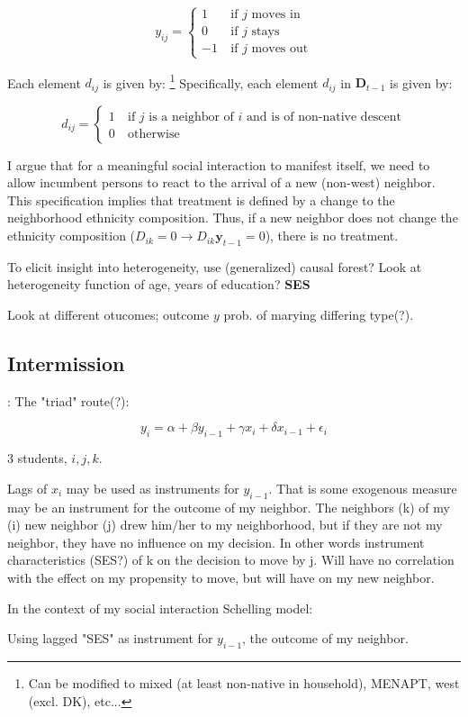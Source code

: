 \documentclass[../main.tex]{subfiles}
\begin{document}
\begin{equation}
    y_{ij} = 
    \begin{cases} 
    1 ~ &\text{if $j$ moves in}  \\
    0 ~ &\text{if $j$ stays} \\
    -1 ~ &\text{if $j$ moves out}
    \end{cases}
\end{equation}


Each element $d_{ij}$ is given by: \footnote{Can be modified to mixed (at least non-native in household), MENAPT, west (excl. DK), etc...} Specifically, each element $d_{ij}$ in $\mathbf{D}_{t-1}$ is given by:

\begin{equation}
    d_{ij} = 
    \begin{cases} 
    1 ~ &\text{if $j$ is a neighbor of $i$ and is of non-native descent}  \\
    0 ~ &\text{otherwise}
    \end{cases}
\end{equation}

I argue that for a meaningful social interaction to manifest itself, we need to allow incumbent persons to react to the arrival of a new (non-west) neighbor. This specification implies that treatment is defined by a change to the neighborhood ethnicity composition. Thus, if a new neighbor does not change the ethnicity composition ($D_{ik} = 0 \rightarrow D_{ik}\mathbf{y}_{t-1}=0$), there is no treatment.




To elicit insight into heterogeneity, use (generalized) causal forest? Look at heterogeneity function of age, years of education? \textbf{SES} 

Look at different otucomes; outcome $y$ prob. of marying differing type(?).

\subsection{Intermission}
\textcite{bramoulle2009_peer_effects}:
The "triad" route(?):

\begin{equation}
    y_i = \alpha + \beta y_{i-1} + \gamma x_{i} + \delta x_ {i-1} + \epsilon_i
\end{equation}

3 students, $i,j,k$. 

Lags of $x_i$ may be used as instruments for $y_{i-1}$. That is some exogenous measure may be an instrument for the outcome of my neighbor. The neighbors (k) of my (i) new neighbor (j) drew him/her to my neighborhood, but if they are not my neighbor, they have no influence on my decision. In other words instrument characteristics (SES?) of k on the decision to move by j. Will have no correlation with the effect on my propensity to move, but will have on my new neighbor.

In the context of my social interaction Schelling model:

Using lagged "SES" as instrument for $y_{i-1}$, the outcome of my neighbor. 
\end{document}
